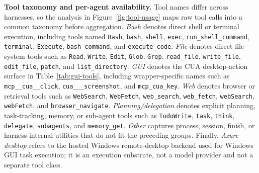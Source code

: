 \noindent \textbf{Tool taxonomy and per-agent availability.}
Tool names differ across harnesses, so the analysis in Figure~\ref{fig:tool-usage} maps raw tool calls into a common taxonomy before aggregation.
\emph{Bash} denotes direct shell or terminal execution, including tools named \texttt{Bash}, \texttt{bash}, \texttt{shell}, \texttt{exec}, \texttt{run\_shell\_command}, \texttt{terminal}, \texttt{Execute}, \texttt{bash\_command}, and \texttt{execute\_code}.
\emph{File} denotes direct file-system tools such as \texttt{Read}, \texttt{Write}, \texttt{Edit}, \texttt{Glob}, \texttt{Grep}, \texttt{read\_file}, \texttt{write\_file}, \texttt{edit\_file}, \texttt{patch}, and \texttt{list\_directory}.
\emph{GUI} denotes the CUA desktop-action surface in Table~\ref{tab:gui-tools}, including wrapper-specific names such as \texttt{mcp\_\_cua\_\_click}, \texttt{cua\_\_\_screenshot}, and \texttt{mcp\_cua\_key}.
\emph{Web} denotes browser or retrieval tools such as \texttt{WebSearch}, \texttt{WebFetch}, \texttt{web\_search}, \texttt{web\_fetch}, \texttt{webSearch}, \texttt{webFetch}, and \texttt{browser\_navigate}.
\emph{Planning/delegation} denotes explicit planning, task-tracking, memory, or sub-agent tools such as \texttt{TodoWrite}, \texttt{task}, \texttt{think}, \texttt{delegate}, \texttt{subagents}, and \texttt{memory\_get}.
\emph{Other} captures process, session, finish, or harness-internal utilities that do not fit the preceding groups.
Finally, \emph{Azure desktop} refers to the hosted Windows remote-desktop backend used for Windows GUI task execution; it is an execution substrate, not a model provider and not a separate tool class.

